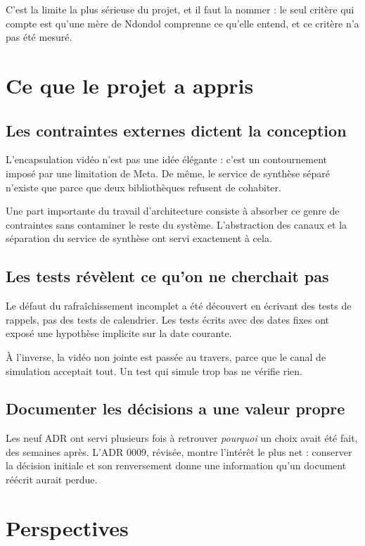 \documentclass[11pt,a4paper]{report}
\begin{document}
C'est la limite la plus sérieuse du projet, et il faut la nommer : le seul
critère qui compte est qu'une mère de Ndondol comprenne ce qu'elle entend, et
ce critère n'a pas été mesuré.

\section{Ce que le projet a appris}

\subsection{Les contraintes externes dictent la conception}

L'encapsulation vidéo n'est pas une idée élégante : c'est un contournement
imposé par une limitation de Meta. De même, le service de synthèse séparé
n'existe que parce que deux bibliothèques refusent de cohabiter.

Une part importante du travail d'architecture consiste à absorber ce genre de
contraintes sans contaminer le reste du système. L'abstraction des canaux et
la séparation du service de synthèse ont servi exactement à cela.

\subsection{Les tests révèlent ce qu'on ne cherchait pas}

Le défaut du rafraîchissement incomplet a été découvert en écrivant des tests
de rappels, pas des tests de calendrier. Les tests écrits avec des dates fixes
ont exposé une hypothèse implicite sur la date courante.

À l'inverse, la vidéo non jointe est passée au travers, parce que le canal de
simulation acceptait tout. Un test qui simule trop bas ne vérifie rien.

\subsection{Documenter les décisions a une valeur propre}

Les neuf ADR ont servi plusieurs fois à retrouver \emph{pourquoi} un choix
avait été fait, des semaines après. L'ADR 0009, révisée, montre l'intérêt le
plus net : conserver la décision initiale et son renversement donne une
information qu'un document réécrit aurait perdue.

\section{Perspectives}
\end{document}
